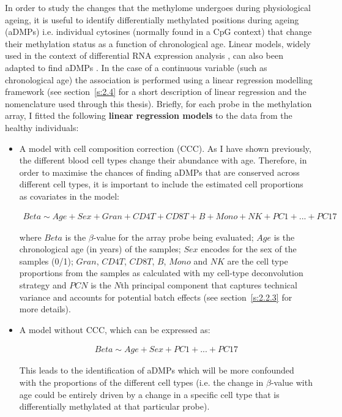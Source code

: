 \bigskip

In order to study the changes that the methylome undergoes during physiological ageing, it is useful to identify differentially methylated positions during ageing (\acrshort{aDMPs}) i.e. individual cytosines (normally found in a CpG context) that change their methylation status as a function of chronological age. Linear models, widely used in the context of differential RNA expression analysis \cite{Ritchie2015}, can also been adapted to find aDMPs \cite{Zhuang2012,Teschendorff2018}. In the case of a continuous variable (such as chronological age) the association is performed using a linear regression modelling framework \cite{Zhuang2012} (see section~\ref{s:2.4} for a short description of linear regression and the nomenclature used through this thesis). Briefly, for each probe in the methylation array, I fitted the following \textbf{linear regression models} to the data from the healthy individuals:

\begin{itemize}

	\item A model with cell composition correction (\acrshort{CCC}). As I have shown previously, the different blood cell types change their abundance with age. Therefore, in order to maximise the chances of finding aDMPs that are conserved across different cell types, it is important to include the estimated cell proportions as covariates in the model:
	
	\begin{align} \label{eq:2.10}
	Beta \sim Age + Sex+ Gran + CD4T + CD8T + B + Mono + NK + PC1 + ... + PC17
	\end{align}
	
	where $Beta$ is the $\beta$-value for the array probe being evaluated; $Age$ is the chronological age (in years) of the samples; $Sex$ encodes for the sex of the samples (0/1); $Gran$, $CD4T$, $CD8T$, $B$, $Mono$ and $NK$ are the cell type proportions from the samples as calculated with my cell-type deconvolution strategy and $PCN$ is the $N$th principal component that captures technical variance and accounts for potential batch effects (see section~\ref{s:2.2.3} for more details).    
	
	\item A model without CCC, which can be expressed as:
	
	\begin{align} \label{eq:2.11}
	Beta \sim Age + Sex+ PC1 + ... + PC17
	\end{align}
	
	This leads to the identification of aDMPs which will be more confounded with the proportions of the different cell types (i.e. the change in $\beta$-value with age could be entirely driven by a change in a specific cell type that is differentially methylated at that particular probe).
	
\end{itemize}

